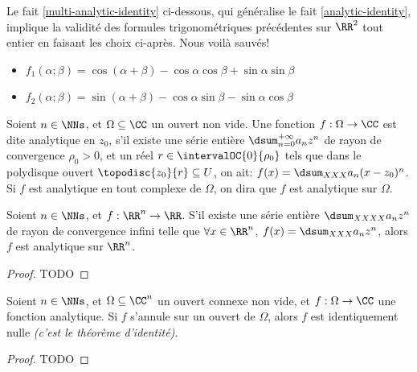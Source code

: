 Le fait \ref{multi-analytic-identity} ci-dessous, qui généralise le fait \ref{analytic-identity}, implique la validité des formules trigonométriques précédentes sur $\RR^2$ tout entier en faisant les choix ci-après.
Nous voilà sauvés!
%
\begin{itemize}[label=\small\textbullet]
	\item $f_1(\alpha ; \beta) = \cos(\alpha + \beta) - \cos \alpha \cos \beta + \sin \alpha \sin \beta$

	\item $f_2(\alpha ; \beta) = \sin(\alpha + \beta) - \cos \alpha \sin \beta - \sin \alpha \cos \beta$
\end{itemize}






\begin{defi}
    Soient $n \in \NNs$, et $\Omega \subseteq \CC$ un ouvert non vide.
	Une fonction $f: \Omega \rightarrow \CC$ est dite analytique en $z_0$, 
	s'il existe
	une série entière $\dsum_{n = 0}^{+\infty} a_n z^n$
	de rayon de convergence $\rho_0 > 0$,
	et
	un réel $r \in \intervalOC{0}{\rho_0}$ tels que dans le polydisque ouvert $\topodisc{z_0}{r} \subseteq U$, on ait:
	$f(x) = \dsum_{XXX} a_n (x - z_0)^n$.
	Si $f$ est analytique en tout complexe de $\Omega$, on dira que $f$ est analytique sur $\Omega$.
\end{defi}



\begin{fact} \label{multi-power-series-vs-analytic}
    Soient $n \in \NNs$, et $f: \RR^n \rightarrow \RR$.
    S'il existe une série entière $\dsum_{XXXX} a_n z^n$ de rayon de convergence infini
    telle que
	$\forall x \in \RR^n$, $f(x) = \dsum_{XXX} a_n z^n$,
	alors
	$f$ est analytique sur $\RR^n$. 
\end{fact}


\begin{proof}
	TODO
\end{proof}



\begin{fact} \label{multi-analytic-identity}
    Soient $n \in \NNs$, et $\Omega \subseteq \CC^n$ un ouvert connexe non vide,
    et
    $f: \Omega \rightarrow \CC$ une fonction analytique.
	Si $f$ s'annule sur un ouvert de $\Omega$, alors $f$ est identiquement nulle
	\emph{(c'est le théorème d'identité)}.  
\end{fact}


\begin{proof}
	TODO
\end{proof}